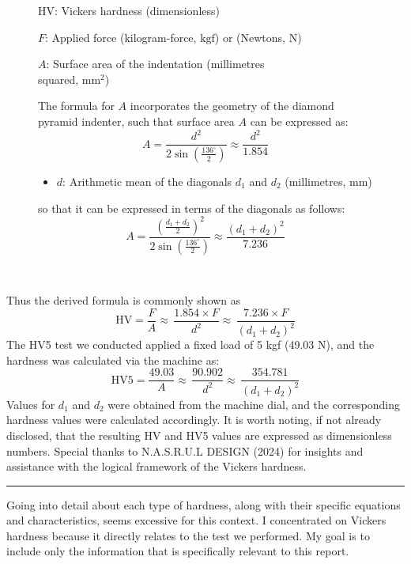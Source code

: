 \documentclass{article}
\newcommand{\wm}[1]{%
	\begin{minipage}{1\textwidth}
		#1
	\end{minipage}%
}
\begin{document}
\begin{figure}[H]
\begin{minipage}{0.51\textwidth}
\begin{itemize}[itemsep=-1mm]
                \item HV: Vickers hardness (dimensionless)
                \item \(F\): Applied force (kilogram-force, \(\text{kgf}\)) or (Newtons, \(\text{N}\))
                \wm{\item \(A\): Surface area of the indentation (millimetres \\squared, \(\text{mm}^2\))}            
            \end{itemize}
            The formula for $A$ incorporates the geometry of the diamond pyramid indenter, such that surface area \(A\) can be expressed as:
            \begin{equation}
                A = \frac{d^2}{2\sin\left(\frac{136^\circ}{2}\right)} \approx \frac{d^2}{1.854} 
            \end{equation}
            \begin{itemize}[itemsep=-1mm]
                \item \( d \): Arithmetic mean of the diagonals \( d_1 \) and \( d_2 \) (millimetres, \(\text{mm}\))
            \end{itemize}
            so that it can be expressed in terms of the diagonals as follows:
            \begin{equation}
                A= \frac{\left(\frac{d_1+d_2}{2}\right)^2}{2\sin\left(\frac{136^\circ}{2}\right)} \approx \frac{\left(d_1 + d_2\right)^2}{7.236}
            \end{equation}
        \end{minipage}\\
    \end{figure}
    \vspace{-1em}\newpage\noindent
    Thus the derived formula is commonly shown as
    \begin{equation}
        {\text{HV} = \frac{F}{A} \approx \, \frac{1.854 \times F}{d^2} \approx \, \frac{7.236\times F}{\left(d_1 + d_2\right)^2}}    
    \end{equation} 
    The HV5 test we conducted applied a fixed load of 5 kgf (49.03 N), and the hardness was calculated via the machine as:  
    \begin{equation}
        \text{HV5} = \frac{49.03}{A} \approx \, \frac{90.902}{d^2} \approx \, \frac{354.781}{\left(d_1 + d_2\right)^2}
    \end{equation}
    Values for \(d_1\) and \(d_2\) were obtained from the machine dial, and the corresponding hardness values were calculated accordingly. It is worth noting, if not already disclosed, that the resulting HV and HV5 values are expressed as dimensionless numbers. Special thanks to N.A.S.R.U.L DESIGN (2024) for insights and assistance with the logical framework of the Vickers hardness.\\[1em]
    \hrule\vspace{1em}
    Going into detail about each type of hardness, along with their specific equations and characteristics, seems excessive for this context. I concentrated on Vickers hardness because it directly relates to the test we performed. My goal is to include only the information that is specifically relevant to this report.
    
\end{document}
